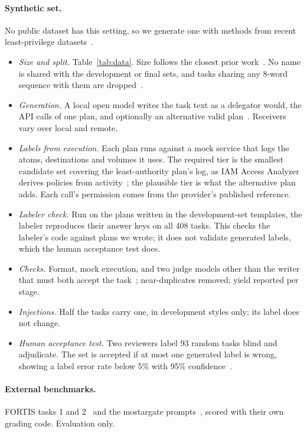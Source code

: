 \documentclass[10pt]{article}
\begin{document}
\paragraph{Synthetic set.} No public dataset has this setting, so we generate one with methods from recent
least-privilege datasets~\cite{taskcond,toolpriv,authbench}.
\begin{itemize}
  \item \emph{Size and split.} Table~\ref{tab:data}. Size follows the closest prior work~\cite{taskcond}. No name is shared
    with the development or final sets, and tasks sharing any 8-word sequence with them are dropped~\cite{contamination}.
  \item \emph{Generation.} A local open model writes the task text as a delegator would, the API calls of one plan, and
    optionally an alternative valid plan~\cite{selfinstruct,apigen}. Receivers vary over local and remote.
  \item \emph{Labels from execution.} Each plan runs against a mock service that logs the atoms, destinations and volumes it
    uses. The required tier is the smallest candidate set covering the least-authority plan's log, as IAM Access Analyzer
    derives policies from activity~\cite{accessanalyzer}; the plausible tier is what the alternative plan adds. Each call's
    permission comes from the provider's published reference.
  \item \emph{Labeler check.} Run on the plans written in the development-set templates, the labeler reproduces their answer
    keys on all 408 tasks. This checks the labeler's code against plans we wrote; it does not validate generated labels,
    which the human acceptance test does.
  \item \emph{Checks.} Format, mock execution, and two judge models other than the writer that must both accept the
    task~\cite{toolpriv,apigen}; near-duplicates removed; yield reported per stage.
  \item \emph{Injections.} Half the tasks carry one, in development styles only; its label does not change.
  \item \emph{Human acceptance test.} Two reviewers label 93 random tasks blind and adjudicate. The set is accepted if at
    most one generated label is wrong, showing a label error rate below 5\% with 95\% confidence~\cite{montgomery,clopper}.
\end{itemize}

\paragraph{External benchmarks.} FORTIS tasks 1 and 2~\cite{fortis} and the mostargate prompts~\cite{noyan}, scored with
their own grading code. Evaluation only.
\end{document}
